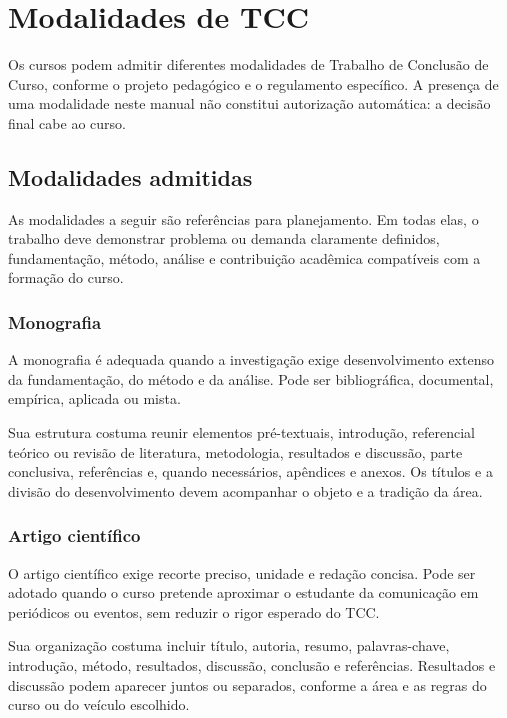 \chapter{Modalidades de TCC}

Os cursos podem admitir diferentes modalidades de Trabalho de Conclusão de Curso, conforme o projeto pedagógico e o regulamento específico. A presença de uma modalidade neste manual não constitui autorização automática: a decisão final cabe ao curso.

\regracurso

\section{Modalidades admitidas}

As modalidades a seguir são referências para planejamento. Em todas elas, o trabalho deve demonstrar problema ou demanda claramente definidos, fundamentação, método, análise e contribuição acadêmica compatíveis com a formação do curso.

\subsection{Monografia}

A monografia é adequada quando a investigação exige desenvolvimento extenso da fundamentação, do método e da análise. Pode ser bibliográfica, documental, empírica, aplicada ou mista.

Sua estrutura costuma reunir elementos pré-textuais, introdução, referencial teórico ou revisão de literatura, metodologia, resultados e discussão, parte conclusiva, referências e, quando necessários, apêndices e anexos. Os títulos e a divisão do desenvolvimento devem acompanhar o objeto e a tradição da área.

\subsection{Artigo científico}

O artigo científico exige recorte preciso, unidade e redação concisa. Pode ser adotado quando o curso pretende aproximar o estudante da comunicação em periódicos ou eventos, sem reduzir o rigor esperado do TCC.

Sua organização costuma incluir título, autoria, resumo, palavras-chave, introdução, método, resultados, discussão, conclusão e referências. Resultados e discussão podem aparecer juntos ou separados, conforme a área e as regras do curso ou do veículo escolhido.

